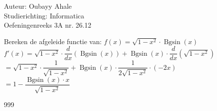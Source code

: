 \documentclass[a4paper]{article}
\begin{document}
  
\noindent \large Auteur: Oubayy Ahale          \\
\noindent \large Studierichting: Informatica   \\
\noindent \large Oefeningenreeks 3A nr. 26.12  \\

\medskip

\normalsize

Bereken de afgeleide functie van: $ f(x) = \sqrt{1 - x^2} \cdot \operatorname{Bgsin}(x) $\\

$ f'(x) = \sqrt{1 - x^2} \cdot \dfrac{d}{dx} (\operatorname{Bgsin}(x)) + \operatorname{Bgsin}(x) \cdot \dfrac{d}{dx} (\sqrt{1 - x^2}) $\\

$ = \sqrt{1 - x^2} \cdot \dfrac{1}{\sqrt{1 - x^2}} + \operatorname{Bgsin}(x) \cdot \dfrac{1}{2 \sqrt{1 - x^2}} \cdot (-2x) $\\

$ = 1 - \dfrac{\operatorname{Bgsin}(x) \cdot x}{\sqrt{1 - x^2}} $\\

\begin{thebibliography}{999}
\end{thebibliography}
\end{document}
